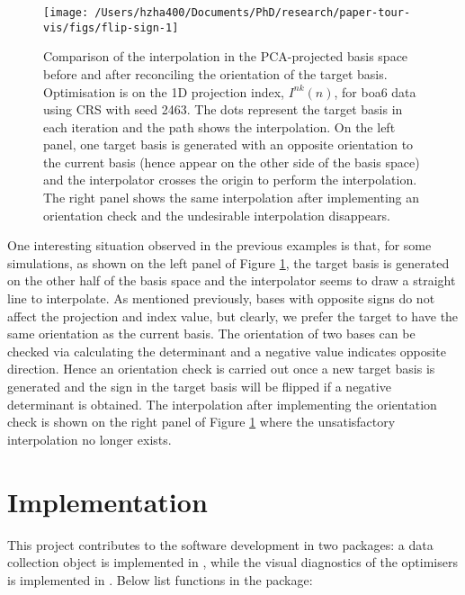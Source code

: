 \begin{Schunk}
\begin{figure}

{\centering \texttt{[image: /Users/hzha400/Documents/PhD/research/paper-tour-vis/figs/flip-sign-1]} 

}

\caption[Comparison of the interpolation in the PCA-projected basis space before and after reconciling the orientation of the target basis]{Comparison of the interpolation in the PCA-projected basis space before and after reconciling the orientation of the target basis. Optimisation is on the 1D projection index, $I^{nk}(n)$, for boa6 data using CRS with seed 2463. The dots represent the target basis in each iteration and the path shows the interpolation. On the left panel, one target basis is generated with an opposite orientation to the current basis (hence appear on the other side of the basis space) and the interpolator crosses the origin to perform the interpolation. The right panel shows the same interpolation after implementing an orientation check and the undesirable interpolation disappears.}\label{fig:flip-sign}
\end{figure}
\end{Schunk}

One interesting situation observed in the previous examples is that, for
some simulations, as shown on the left panel of Figure
\ref{fig:flip-sign}, the target basis is generated on the other half of
the basis space and the interpolator seems to draw a straight line to
interpolate. As mentioned previously, bases with opposite signs do not
affect the projection and index value, but clearly, we prefer the target
to have the same orientation as the current basis. The orientation of
two bases can be checked via calculating the determinant and a negative
value indicates opposite direction. Hence an orientation check is
carried out once a new target basis is generated and the sign in the
target basis will be flipped if a negative determinant is obtained. The
interpolation after implementing the orientation check is shown on the
right panel of Figure \ref{fig:flip-sign} where the unsatisfactory
interpolation no longer exists.

\hypertarget{implementation}{%
\section{Implementation}\label{implementation}}

This project contributes to the software development in two packages: a
data collection object is implemented in  \citep{tourr},
while the visual diagnostics of the optimisers is implemented in
 \citep{ferrn}. Below list functions in the 
\citep{ferrn} package:

